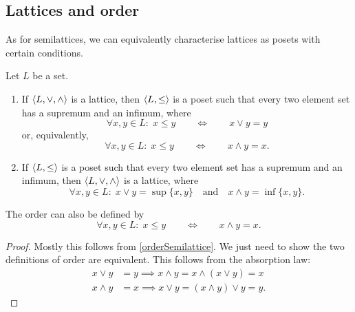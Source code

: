 \subsection{Lattices and order}
As for semilattices, we can equivalently characterise lattices as posets with certain conditions.
\begin{proposition}
Let $L$ be a set.
\begin{enumerate}
\item If $\langle L,\vee, \wedge \rangle$ is a lattice, then $\langle L,\leq \rangle$ is a poset such that every two element set has a supremum and an infimum, where
\[ \forall x,y\in L:\; x\leq y \qquad \iff \qquad x\vee y = y \]
or, equivalently,
\[ \forall x,y\in L:\; x\leq y \qquad \iff \qquad x\wedge y = x. \]
\item If $\langle L,\leq \rangle$ is a poset such that every two element set has a supremum and an infimum, then $\langle L,\vee, \wedge \rangle$ is a lattice, where
\[ \forall x,y\in L: \; x\vee y = \sup\{x,y\} \quad \text{and} \quad x\wedge y = \inf\{x,y\}. \]
\end{enumerate}
The order can also be defined by
\[ \forall x,y\in L:\; x\leq y \qquad \iff \qquad x\wedge y = x. \]
\end{proposition}
\begin{proof}
Mostly this follows from \ref{orderSemilattice}. We just need to show the two definitions of order are equivalent. This follows from the absorption law:
\begin{align*}
x\vee y &= y \implies x\wedge y = x\wedge (x\vee y) = x \\
x\wedge y &= x \implies x\vee y = (x\wedge y) \vee y = y.
\end{align*}
\end{proof}

